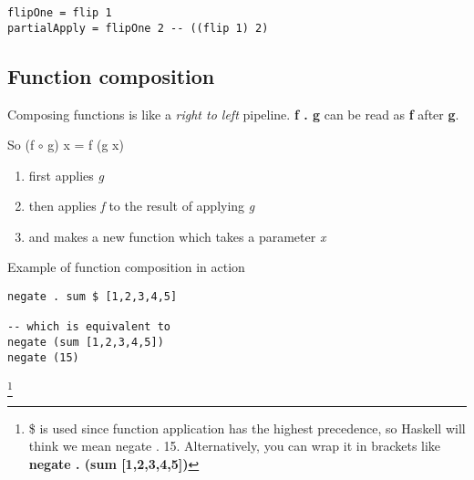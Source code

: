 \begin{lstlisting}
flipOne = flip 1
partialApply = flipOne 2 -- ((flip 1) 2)
\end{lstlisting}

\subsection{Function composition}
Composing functions is like a \emph{right to left} pipeline. \textbf{f . g} can be read
as \textbf{f} after \textbf{g}.

So (f $\circ$ g) x = f (g x)
\begin{enumerate}
    \item first applies \emph{g}
    \item then applies \emph{f} to the result of applying \emph{g}
    \item and makes a new function which takes a parameter \emph{x}
\end{enumerate} 

Example of function composition in action
\begin{lstlisting}
negate . sum $ [1,2,3,4,5]

-- which is equivalent to
negate (sum [1,2,3,4,5])
negate (15)
\end{lstlisting}

\footnote{
    \$ is used since function application has the highest precedence, so Haskell will think we mean negate . 15.
    Alternatively, you can wrap it in brackets like \textbf{negate . (sum [1,2,3,4,5])}}